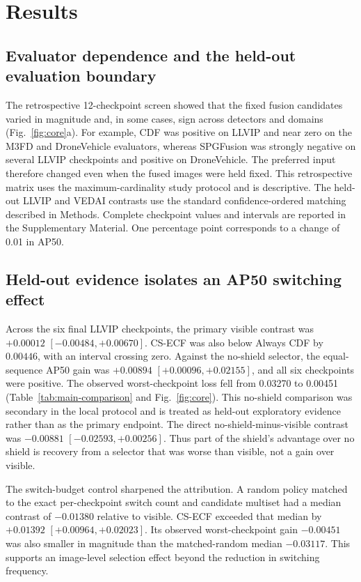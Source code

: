 \documentclass[preprint,11pt]{elsarticle}
\begin{document}
\section{Results}

\subsection{Evaluator dependence and the held-out evaluation boundary}

The retrospective 12-checkpoint screen showed that the fixed fusion candidates
varied in magnitude and, in some cases, sign across detectors and domains
(Fig.~\ref{fig:core}a). For example, CDF was positive on LLVIP and near zero on
the M3FD and DroneVehicle evaluators, whereas SPGFusion was strongly negative
on several LLVIP checkpoints and positive on DroneVehicle. The preferred input
therefore changed even when the fused images were held fixed. This retrospective
matrix uses the maximum-cardinality study protocol and is descriptive. The
held-out LLVIP and VEDAI contrasts use the standard confidence-ordered matching
described in Methods. Complete checkpoint values and intervals are reported in the
Supplementary Material.
One percentage point corresponds to a change of 0.01 in AP50.

\subsection{Held-out evidence isolates an AP50 switching effect}

Across the six final LLVIP checkpoints, the primary visible contrast was
\(+0.00012\) \([-0.00484,+0.00670]\). CS-ECF was also below Always CDF by
\(0.00446\), with an interval crossing zero. Against the no-shield
selector, the equal-sequence AP50 gain was \(+0.00894\)
\([+0.00096,+0.02155]\), and all six checkpoints were positive. The observed
worst-checkpoint loss fell from 0.03270 to 0.00451
(Table~\ref{tab:main-comparison} and Fig.~\ref{fig:core}).
This no-shield comparison was secondary in the local protocol and is treated
as held-out exploratory evidence rather than as the primary endpoint.
The direct no-shield-minus-visible contrast was \(-0.00881\)
\([-0.02593,+0.00256]\). Thus part of the shield's advantage over no shield is
recovery from a selector that was worse than visible, not a gain over visible.

The switch-budget control sharpened the attribution. A random policy matched
to the exact per-checkpoint switch count and candidate multiset had a median
contrast of \(-0.01380\) relative to visible. CS-ECF exceeded that median by
\(+0.01392\) \([+0.00964,+0.02023]\). Its observed worst-checkpoint gain
\(-0.00451\) was also smaller in magnitude than the matched-random median
\(-0.03117\). This supports an image-level selection effect beyond the
reduction in switching frequency.
\end{document}
